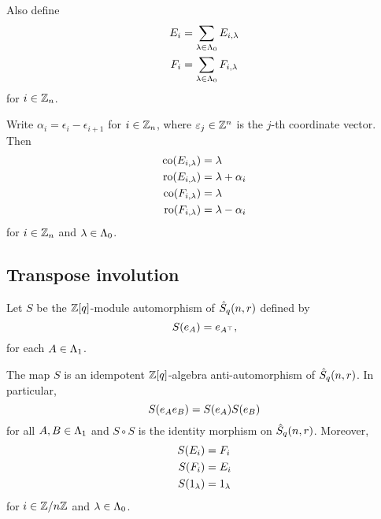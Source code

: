 \documentclass[a4paper, 11pt, twoside]{report}
\begin{document}
Also define
\begin{align*}
E_i &= \sum_{\lambda\in\Lambda_0{}} E_{i,\lambda}\\
F_i &= \sum_{\lambda\in\Lambda_0{}} F_{i,\lambda}
\end{align*}
for $i\in\mathbb{Z}_n$.

Write $\alpha_i=\epsilon_i - \epsilon_{i+1}$ for $i\in\mathbb{Z}_n$, where $\varepsilon_j\in\mathbb{Z}^n$ is the $j$-th coordinate vector. Then
\begin{align*}
\operatorname{co}(E_{i,\lambda}) &= \lambda\\
\operatorname{ro}(E_{i,\lambda}) &= \lambda +\alpha_i\\
\operatorname{co}(F_{i,\lambda}) &= \lambda\\
\operatorname{ro}(F_{i,\lambda}) &= \lambda - \alpha_i
\end{align*}
for $i\in\mathbb{Z}_n$ and $\lambda\in\Lambda_0{}$.


\subsection{Transpose involution}

Let $S$ be the $\mathbb{Z}[q]$-module automorphism of $\hat{S}_q(n,r)$ defined by
\begin{equation*}
S{(e_A)} = e_{A^\top},
\end{equation*}
for each $A\in\Lambda_1{}$.

\begin{lemma}\label{lemma:transpose-involution}
The map $S$ is an idempotent $\mathbb{Z}[q]$-algebra anti-automorphism of $\hat{S}_q(n,r)$. In particular,
\begin{equation*}
S{(e_Ae_B)}=S{(e_A)}S{(e_B)}
\end{equation*}
for all $A,B\in\Lambda_1{}$ and $S\circ S$ is the identity morphism on $\hat{S}_q(n,r)$. Moreover,
\begin{align*}
S{(E_i)} &= F_i\\
S{(F_i)} &= E_i\\
S{(1_\lambda)} &= 1_\lambda
\end{align*}
for $i\in\mathbb{Z}/{n \mathbb{Z}}$ and $\lambda\in\Lambda_0{}$.
\end{lemma}
\end{document}
